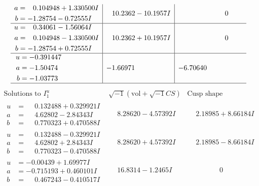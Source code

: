 \documentclass[1p]{elsarticle_modified}
\theoremstyle{definition}
\newcommand{\I}{\sqrt{-1}}
\begin{document}
$$\begin{array}{c|c|c}
\begin{aligned}
a &= \phantom{-}0.104948 + 1.330500 I \\
b &= -1.28754 - 0.72555 I\end{aligned}
 & \phantom{-}10.2362 - 10.1957 I & \phantom{-0.000000 } 0 \\ \hline\begin{aligned}
u &= \phantom{-}0.34061 - 1.56064 I \\
a &= \phantom{-}0.104948 - 1.330500 I \\
b &= -1.28754 + 0.72555 I\end{aligned}
 & \phantom{-}10.2362 + 10.1957 I & \phantom{-0.000000 } 0 \\ \hline\begin{aligned}
u &= -0.391447\phantom{ +0.000000I} \\
a &= -1.50474\phantom{ +0.000000I} \\
b &= -1.03773\phantom{ +0.000000I}\end{aligned}
 & -1.66971\phantom{ +0.000000I} & -6.70640\phantom{ +0.000000I}\\
 \hline 
 \end{array}$$\newpage$$\begin{array}{c|c|c}  
\text{Solutions to }I^u_{1}& \I (\text{vol} + \sqrt{-1}CS) & \text{Cusp shape}\\
 \hline 
\begin{aligned}
u &= \phantom{-}0.132488 + 0.329921 I \\
a &= \phantom{-}4.62802 - 2.84343 I \\
b &= \phantom{-}0.770323 + 0.470588 I\end{aligned}
 & \phantom{-}8.28620 - 4.57392 I & \phantom{-}2.18985 + 8.66184 I \\ \hline\begin{aligned}
u &= \phantom{-}0.132488 - 0.329921 I \\
a &= \phantom{-}4.62802 + 2.84343 I \\
b &= \phantom{-}0.770323 - 0.470588 I\end{aligned}
 & \phantom{-}8.28620 + 4.57392 I & \phantom{-}2.18985 - 8.66184 I \\ \hline\begin{aligned}
u &= -0.00439 + 1.69977 I \\
a &= -0.715193 + 0.460101 I \\
b &= \phantom{-}0.467243 - 0.410517 I\end{aligned}
 & \phantom{-}16.8314 - 1.2465 I & \phantom{-0.000000 } 0 \\ \hline\begin{aligned}

\end{aligned}
\end{array}$$
\end{document}
